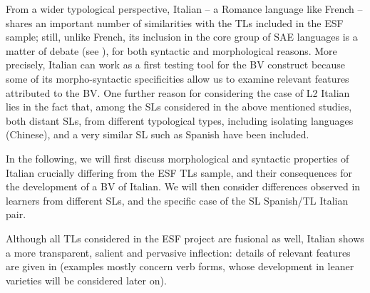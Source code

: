 \documentclass[output=paper]{langscibook}
\begin{document}
\begin{sloppypar}
From a wider typological perspective, Italian -- a Romance language like French -- shares an important number of similarities with the TLs included in the ESF sample; still, unlike French, its inclusion in the core group of SAE languages is a matter of debate (see \citealt{Dahl1990, HeineKuteva2006}), for both syntactic and morphological reasons. More precisely, Italian can work as a first testing tool for the BV construct because some of its morpho-syntactic specificities allow us to examine relevant features attributed to the BV. One further reason for considering the case of L2 Italian lies in the fact that, among the SLs considered in the above mentioned studies, both distant SLs, from different typological types, including isolating languages (Chinese), and a very similar SL such as Spanish have been included.
\end{sloppypar} 

In the following, we will first discuss morphological and syntactic properties of Italian crucially differing from the ESF TLs sample, and their consequences for the development of a BV of Italian. We will then consider differences observed in learners from different SLs, and the specific case of the SL Spanish\slash TL Italian pair.\largerpage

Although all TLs considered in the ESF project are fusional as well, Italian shows a more transparent, salient and pervasive inflection: details of relevant features are given in  (examples mostly concern verb forms, whose development in leaner varieties will be considered later on).
\end{document}
